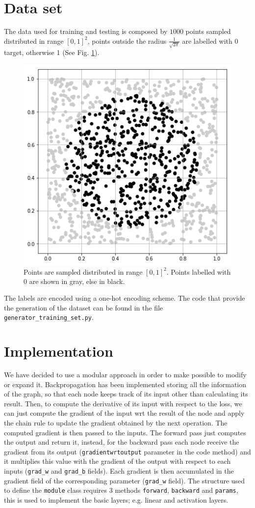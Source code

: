 \documentclass[journal, a4paper]{IEEEtran}
\begin{document}
\section{Data set}
\label{sec:dataset}
The data used for training and testing is composed by $1000$ points sampled distributed in range $[0, 1]^2$, points outside the radius $\frac{1}{\sqrt{2\pi}}$ are labelled with 0 target, otherwise 1 (See Fig. \ref{fig:generated-dataset}).
\begin{figure}[!h]
    \centering
    \includegraphics[width=0.8\linewidth]{gen.png}
    \caption{Points are sampled distributed in range $[0, 1]^2$. Points labelled with 0 are shown in gray, else in black.}
    \label{fig:generated-dataset}
\end{figure}
The labels are encoded using a one-hot encoding scheme.
The code that provide the generation of the dataset can be found in the file \texttt{generator\_training\_set.py}.


\section{Implementation}
We have decided to use a modular approach in order to make possible to modify or expand it. Backpropagation has been implemented storing all the information of the graph, so that each node keeps track of its input other than calculating its result. Then, to compute the derivative of its input with respect to the loss, we can just compute the gradient of the input wrt the result of the node and apply the chain rule to update the gradient obtained by the next operation. The computed gradient is then passed to the inputs. The forward pass just computes the output and return it, instead, for the backward pass each node receive the gradient from its output (\texttt{gradientwrtoutput} parameter in the code method) and it multiplies this value with the gradient of the output with respect to each inputs (\texttt{grad\_w} and \texttt{grad\_b} fields). Each gradient is then accumulated in the gradient field of the corresponding parameter (\texttt{grad\_w} field). The structure used to define the \texttt{module} class requires 3 methods \texttt{forward}, \texttt{backward} and \texttt{params}, this is used to implement the basic layers; e.g. linear and activation layers.
\end{document}
